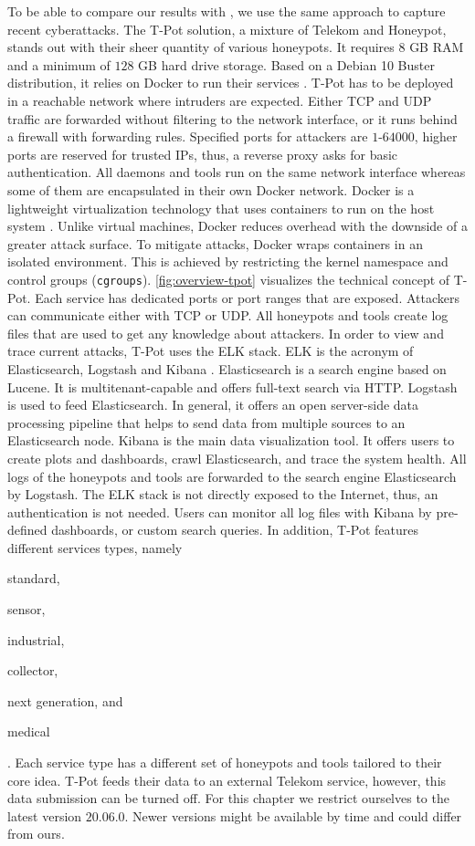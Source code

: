 To be able to compare our results with \citet{Kelly2021}, we use the same approach to capture recent cyberattacks.
The T-Pot solution, a mixture of Telekom and Honeypot, stands out with their sheer quantity of various honeypots.
It requires $8$ GB RAM and a minimum of $128$ GB hard drive storage.
Based on a Debian 10 Buster distribution, it relies on Docker to run their services \cite{docker2021}.
T-Pot has to be deployed in a reachable network where intruders are expected.
Either TCP and UDP traffic are forwarded without filtering to the network interface, or it runs behind a firewall with forwarding rules.
Specified ports for attackers are $1$-$64000$, higher ports are reserved for trusted IPs, thus, a reverse proxy asks for basic authentication.
All daemons and tools run on the same network interface whereas some of them are encapsulated in their own Docker network.
Docker is a lightweight virtualization technology that uses containers to run on the host system \cite{combe2016}.
Unlike virtual machines, Docker reduces overhead with the downside of a greater attack surface.
To mitigate attacks, Docker wraps containers in an isolated environment.
This is achieved by restricting the kernel namespace and control groups (\verb|cgroups|).
\autoref{fig:overview-tpot} visualizes the technical concept of T-Pot.
Each service has dedicated ports or port ranges that are exposed.
Attackers can communicate either with TCP or UDP.
All honeypots and tools create log files that are used to get any knowledge about attackers.
In order to view and trace current attacks, T-Pot uses the ELK stack.
ELK is the acronym of Elasticsearch, Logstash and Kibana \cite{elastic2021}.
Elasticsearch is a search engine based on Lucene.
It is multitenant-capable and offers full-text search via HTTP.
Logstash is used to feed Elasticsearch.
In general, it offers an open server-side data processing pipeline that helps to send data from multiple sources to an Elasticsearch node.
Kibana is the main data visualization tool.
It offers users to create plots and dashboards, crawl Elasticsearch, and trace the system health.
All logs of the honeypots and tools are forwarded to the search engine Elasticsearch by Logstash.
The ELK stack is not directly exposed to the Internet, thus, an authentication is not needed.
Users can monitor all log files with Kibana by pre-defined dashboards, or custom search queries.
In addition, T-Pot features different services types, namely
\begin{enumerate*}[label=(\roman*)]
    \item standard,
    \item sensor,
    \item industrial,
    \item collector,
    \item next generation, and
    \item medical
\end{enumerate*}.
Each service type has a different set of honeypots and tools tailored to their core idea.
T-Pot feeds their data to an external Telekom service, however, this data submission can be turned off.
For this chapter we restrict ourselves to the latest version $20.06.0$.
Newer versions might be available by time and could differ from ours.


